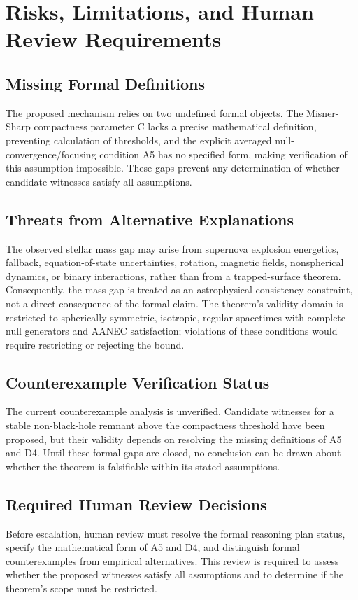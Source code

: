\documentclass[conference]{IEEEtran}
\begin{document}
\section{Risks, Limitations, and Human Review Requirements}
\subsection{Missing Formal Definitions}
The proposed mechanism relies on two undefined formal objects. The Misner-Sharp compactness parameter C lacks a precise mathematical definition, preventing calculation of thresholds, and the explicit averaged null-convergence/focusing condition A5 has no specified form, making verification of this assumption impossible. These gaps prevent any determination of whether candidate witnesses satisfy all assumptions.

\subsection{Threats from Alternative Explanations}
The observed stellar mass gap may arise from supernova explosion energetics, fallback, equation-of-state uncertainties, rotation, magnetic fields, nonspherical dynamics, or binary interactions, rather than from a trapped-surface theorem. Consequently, the mass gap is treated as an astrophysical consistency constraint, not a direct consequence of the formal claim. The theorem's validity domain is restricted to spherically symmetric, isotropic, regular spacetimes with complete null generators and AANEC satisfaction; violations of these conditions would require restricting or rejecting the bound.

\subsection{Counterexample Verification Status}
The current counterexample analysis is unverified. Candidate witnesses for a stable non-black-hole remnant above the compactness threshold have been proposed, but their validity depends on resolving the missing definitions of A5 and D4. Until these formal gaps are closed, no conclusion can be drawn about whether the theorem is falsifiable within its stated assumptions.

\subsection{Required Human Review Decisions}
Before escalation, human review must resolve the formal reasoning plan status, specify the mathematical form of A5 and D4, and distinguish formal counterexamples from empirical alternatives. This review is required to assess whether the proposed witnesses satisfy all assumptions and to determine if the theorem's scope must be restricted.
\end{document}
